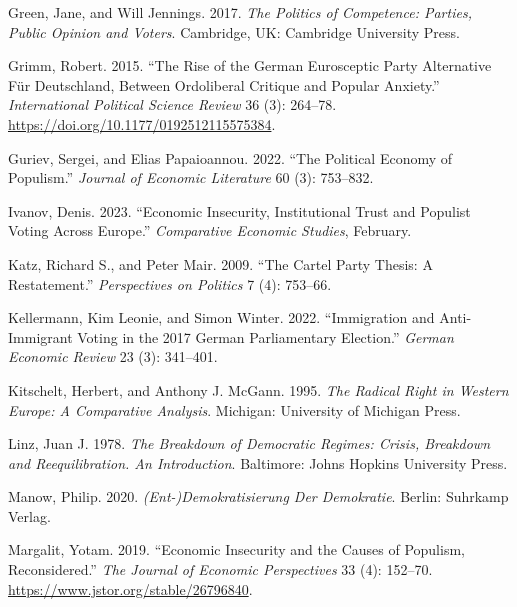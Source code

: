 \documentclass[
]{article}
\newlength{\cslhangindent}
\newlength{\cslentryspacingunit} %
\newenvironment{CSLReferences}[2] %
 {%
  \setlength{\parindent}{0pt}
  \ifodd #1
  \let\oldpar\par
  \def\par{\hangindent=\cslhangindent\oldpar}
  \fi
  \setlength{\parskip}{#2\cslentryspacingunit}
 }%
 {}
\begin{document}
\begin{CSLReferences}{1}{0}
\leavevmode{}%
Green, Jane, and Will Jennings. 2017. \emph{The {Politics} of
{Competence}: {Parties}, {Public} {Opinion} and {Voters}}. Cambridge,
UK: Cambridge University Press.

\leavevmode{}%
Grimm, Robert. 2015. {``The Rise of the {German} {Eurosceptic} Party
{Alternative} Für {Deutschland}, Between Ordoliberal Critique and
Popular Anxiety.''} \emph{International Political Science Review} 36
(3): 264--78. \url{https://doi.org/10.1177/0192512115575384}.

\leavevmode{}%
Guriev, Sergei, and Elias Papaioannou. 2022. {``The {Political}
{Economy} of {Populism}.''} \emph{Journal of Economic Literature} 60
(3): 753--832.

\leavevmode{}%
Ivanov, Denis. 2023. {``Economic {Insecurity}, {Institutional} {Trust}
and {Populist} {Voting} {Across} {Europe}.''} \emph{Comparative Economic
Studies}, February.

\leavevmode{}%
Katz, Richard S., and Peter Mair. 2009. {``The {Cartel} {Party}
{Thesis}: {A} {Restatement}.''} \emph{Perspectives on Politics} 7 (4):
753--66.

\leavevmode{}%
Kellermann, Kim Leonie, and Simon Winter. 2022. {``Immigration and
Anti-Immigrant Voting in the 2017 {German} Parliamentary Election.''}
\emph{German Economic Review} 23 (3): 341--401.

\leavevmode{}%
Kitschelt, Herbert, and Anthony J. McGann. 1995. \emph{The {Radical}
{Right} in {Western} {Europe}: {A} {Comparative} {Analysis}}. Michigan:
University of Michigan Press.

\leavevmode{}%
Linz, Juan J. 1978. \emph{The {Breakdown} of {Democratic} {Regimes}:
{Crisis}, {Breakdown} and {Reequilibration}. {An} {Introduction}}.
Baltimore: Johns Hopkins University Press.

\leavevmode{}%
Manow, Philip. 2020. \emph{({Ent}-){Demokratisierung} Der {Demokratie}}.
Berlin: Suhrkamp Verlag.

\leavevmode{}%
Margalit, Yotam. 2019. {``Economic {Insecurity} and the {Causes} of
{Populism}, {Reconsidered}.''} \emph{The Journal of Economic
Perspectives} 33 (4): 152--70.
\url{https://www.jstor.org/stable/26796840}.


\end{CSLReferences}
\end{document}
